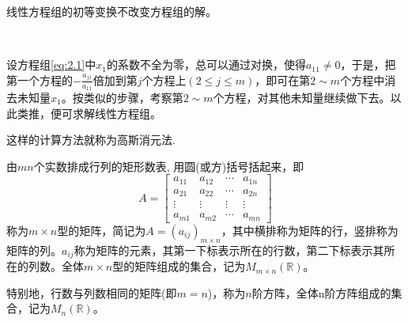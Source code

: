 
\begin{prop}
线性方程组的初等变换不改变方程组的解。
\end{prop}

\begin{Def}[高斯消元法]\

设方程组\eqref{eq:2.1}中$x_1$的系数不全为零，总可以通过对换，使得$a_{11}\neq0$，于是，把第一个方程的$-\frac{a_{j1}}{a_{11}}$倍加到第$j$个方程上$(2 \leqslant j \leqslant m)$，即可在第$2\sim m$个方程中消去未知量$x_1$。按类似的步骤，考察第$2\sim m$个方程，对其他未知量继续做下去。以此类推，便可求解线性方程组。

这样的计算方法就称为高斯消元法.

\end{Def}

\begin{Def}
由$mn$个实数排成行列的矩形数表, 用圆(或方)括号括起来，即
$$A = \begin{bmatrix}
a_{11} & a_{12} & \cdots & a_{1n} \\ a_{21} & a_{22} & \cdots & a_{2n} \\ \vdots & \vdots & \vdots & \vdots \\ a_{m1} & a_{m2} & \cdots & a_{mn}
\end{bmatrix}$$
称为$m\times n$型的矩阵，简记为$A = (a_{ij})_{m\times n}$，其中横排称为矩阵的行，竖排称为矩阵的列。$a_{ij}$称为矩阵的元素，其第一下标表示所在的行数，第二下标表示其所在的列数。全体$m\times n$型的矩阵组成的集合，记为$M_{m\times n}(\mathbb{R})$。

特别地，行数与列数相同的矩阵(即$m = n$)，称为$n$阶方阵，全体n阶方阵组成的集合，记为$M_n(\mathbb{R})$。
\end{Def}

